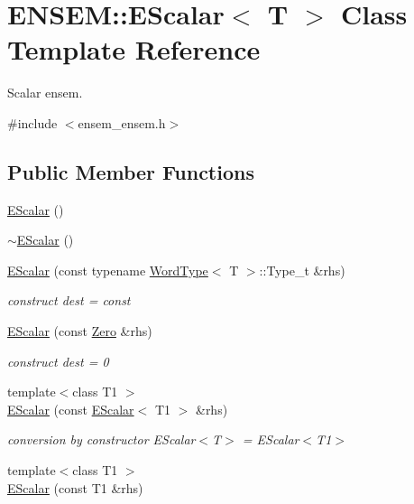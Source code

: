 \hypertarget{classENSEM_1_1EScalar}{}\section{E\+N\+S\+EM\+:\+:E\+Scalar$<$ T $>$ Class Template Reference}
\label{classENSEM_1_1EScalar}


Scalar ensem.  




{\ttfamily \#include $<$ensem\+\_\+ensem.\+h$>$}

\subsection*{Public Member Functions}
\begin{DoxyCompactItemize}
\item 
\mbox{\hyperlink{classENSEM_1_1EScalar_ad4290141b2f7d43b6652d8ef95dfdbf5}{E\+Scalar}} ()
\item 
\mbox{\hyperlink{classENSEM_1_1EScalar_addb090b46c2b6abdff79eb52bad58091}{$\sim$\+E\+Scalar}} ()
\item 
\mbox{\hyperlink{classENSEM_1_1EScalar_ad064adaa15e67106893182ba57c6fd91}{E\+Scalar}} (const typename \mbox{\hyperlink{structENSEM_1_1WordType}{Word\+Type}}$<$ T $>$\+::Type\+\_\+t \&rhs)
\begin{DoxyCompactList}\small\item\em construct dest = const \end{DoxyCompactList}\item 
\mbox{\hyperlink{classENSEM_1_1EScalar_aa50915f887b0e206aecad55b2f25e4de}{E\+Scalar}} (const \mbox{\hyperlink{structENSEM_1_1Zero}{Zero}} \&rhs)
\begin{DoxyCompactList}\small\item\em construct dest = 0 \end{DoxyCompactList}\item 
{\footnotesize template$<$class T1 $>$ }\\\mbox{\hyperlink{classENSEM_1_1EScalar_a62e800e98a28c98a6d297eb613e86f82}{E\+Scalar}} (const \mbox{\hyperlink{classENSEM_1_1EScalar}{E\+Scalar}}$<$ T1 $>$ \&rhs)
\begin{DoxyCompactList}\small\item\em conversion by constructor E\+Scalar$<$\+T$>$ = E\+Scalar$<$\+T1$>$ \end{DoxyCompactList}\item 
{\footnotesize template$<$class T1 $>$ }\\\mbox{\hyperlink{classENSEM_1_1EScalar_a1436a0e5b8bf00083caf1540f4fc9397}{E\+Scalar}} (const T1 \&rhs)

\end{DoxyCompactItemize}
